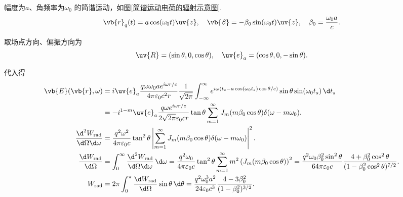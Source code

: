 \begin{example}
	幅度为\(a\)、角频率为\(\omega_{0}\) 的简谐运动，如图\ref{简谐运动电荷的辐射示意图}.
	\begin{equation*}
		\vb{r}_{q}(t) = a \cos(\omega_{0} t) \uv{z}, \quad \vb{\beta} = -\beta_{0} \sin(\omega_{0} t) \uv{z}, \quad \beta_{0} = \frac{\omega_{0} a}{c}.
	\end{equation*}

	取场点方向、偏振方向为
	\begin{equation*}
		\uv{R} = (\sin\theta, 0, \cos\theta), \quad \uv{e}_{a} = (\cos\theta, 0, -\sin\theta).
	\end{equation*}

	代入得
	\begin{align*}
		\vb{E}(\vb{r}, \omega) &= i \uv{e}_{a} \frac{q \omega \omega_{0} a e^{i\omega r/c}}{4\pi \varepsilon_{0} c^{2} r} \frac{1}{\sqrt{2\pi}} \int_{-\infty}^{\infty} e^{i\omega \left( t_{s} - a \cos(\omega_{0} t_{s}) \cos\theta/c \right)} \sin\theta \sin(\omega_{0} t_{s}) \, \d t_{s} \\
		&= -i^{1-m} \uv{e}_{a} \frac{q \omega e^{i\omega r/c}}{2\sqrt{2\pi} \varepsilon_{0} c r} \tan\theta \sum_{m=1}^{\infty} J_{m}(m\beta_{0} \cos\theta) \delta(\omega - m\omega_{0}). \\
		\frac{\d^{2} W_{\mathrm{rad}}}{\d \Omega \d \omega} &= \frac{q^{2} \omega^{2}}{4\pi \varepsilon_{0} c} \tan^{2}\theta \left| \sum_{m=1}^{\infty} J_{m}(m\beta_{0} \cos\theta) \delta(\omega - m\omega_{0}) \right|^{2}. \\
		\frac{\d  W_{\mathrm{rad}}}{\d \Omega} &= \int_{0}^{\infty} \frac{\d^{2} W_{\mathrm{rad}}}{\d \Omega \d \omega} \, \d \omega = \frac{q^{2} \omega_{0}}{4\pi \varepsilon_{0} c} \tan^{2}\theta \sum_{m=1}^{\infty} m^{2} \left( J_{m}(m\beta_{0} \cos\theta) \right)^{2} = \frac{q^{2} \omega_{0} \beta_{0}^{2} \sin^{2}\theta}{64\pi \varepsilon_{0} c} \frac{4 + \beta_{0}^{2} \cos^{2}\theta}{(1 - \beta_{0}^{2} \cos^{2}\theta)^{7/2}}. \\
		W_{\mathrm{rad}} &= 2\pi \int_{0}^{\pi} \frac{\d  W_{\mathrm{rad}}}{\d \Omega} \sin\theta \, \d \theta = \frac{q^{2} \omega_{0}^{3} a^{2}}{24 \varepsilon_{0} c^{3}} \frac{4 - 3\beta_{0}^{2}}{(1 - \beta_{0}^{2})^{3/2}}.
	\end{align*}
\end{example}
